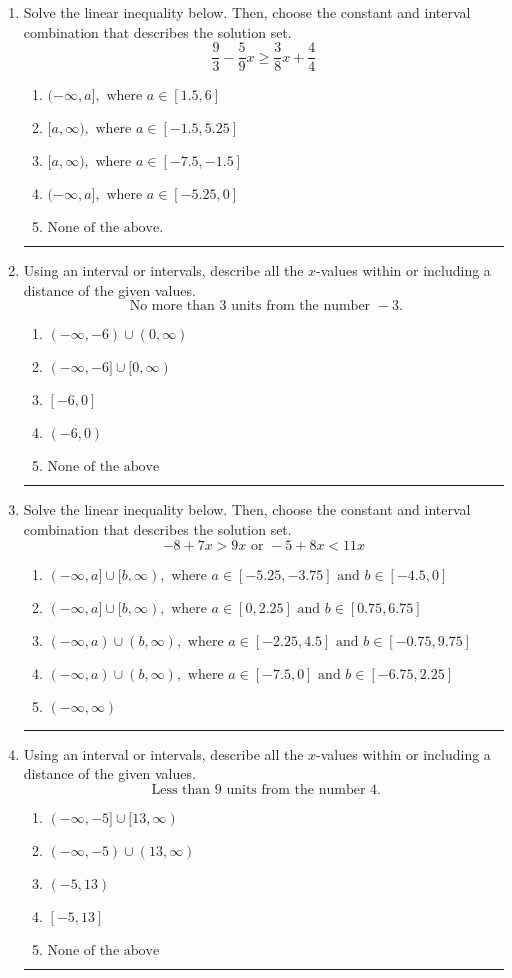 \documentclass[14pt]{extbook}
\newcommand{\litem}[1]{\item#1\hspace*{-1cm}\rule{\textwidth}{0.4pt}}
\begin{document}
\begin{enumerate}
{\begin{enumerate}[label=\Alph*.]
\end{enumerate} }
\litem{
Solve the linear inequality below. Then, choose the constant and interval combination that describes the solution set.\[ \frac{9}{3} - \frac{5}{9} x \geq \frac{3}{8} x + \frac{4}{4} \]\begin{enumerate}[label=\Alph*.]
\item \( (-\infty, a], \text{ where } a \in [1.5, 6] \)
\item \( [a, \infty), \text{ where } a \in [-1.5, 5.25] \)
\item \( [a, \infty), \text{ where } a \in [-7.5, -1.5] \)
\item \( (-\infty, a], \text{ where } a \in [-5.25, 0] \)
\item \( \text{None of the above}. \)

\end{enumerate} }
\litem{
Using an interval or intervals, describe all the $x$-values within or including a distance of the given values.\[ \text{ No more than } 3 \text{ units from the number } -3. \]\begin{enumerate}[label=\Alph*.]
\item \( (-\infty, -6) \cup (0, \infty) \)
\item \( (-\infty, -6] \cup [0, \infty) \)
\item \( [-6, 0] \)
\item \( (-6, 0) \)
\item \( \text{None of the above} \)

\end{enumerate} }
\litem{
Solve the linear inequality below. Then, choose the constant and interval combination that describes the solution set.\[ -8 + 7 x > 9 x \text{ or } -5 + 8 x < 11 x \]\begin{enumerate}[label=\Alph*.]
\item \( (-\infty, a] \cup [b, \infty), \text{ where } a \in [-5.25, -3.75] \text{ and } b \in [-4.5, 0] \)
\item \( (-\infty, a] \cup [b, \infty), \text{ where } a \in [0, 2.25] \text{ and } b \in [0.75, 6.75] \)
\item \( (-\infty, a) \cup (b, \infty), \text{ where } a \in [-2.25, 4.5] \text{ and } b \in [-0.75, 9.75] \)
\item \( (-\infty, a) \cup (b, \infty), \text{ where } a \in [-7.5, 0] \text{ and } b \in [-6.75, 2.25] \)
\item \( (-\infty, \infty) \)

\end{enumerate} }
\litem{
Using an interval or intervals, describe all the $x$-values within or including a distance of the given values.\[ \text{ Less than } 9 \text{ units from the number } 4. \]\begin{enumerate}[label=\Alph*.]
\item \( (-\infty, -5] \cup [13, \infty) \)
\item \( (-\infty, -5) \cup (13, \infty) \)
\item \( (-5, 13) \)
\item \( [-5, 13] \)
\item \( \text{None of the above} \)


\end{enumerate}}
\end{enumerate}
\end{document}
